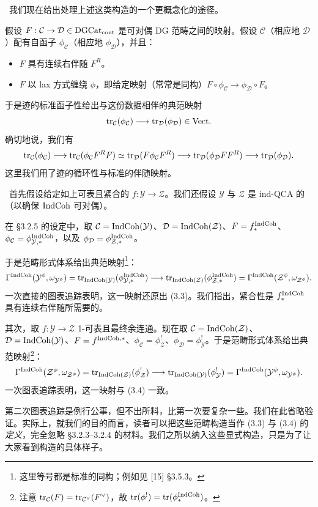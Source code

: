 \ 我们现在给出处理上述这类构造的一个更概念化的途径。

假设 $F : \mathcal{C} \to \mathcal{D} \in \mathrm{DGCat}_{\mathrm{cont}}$ 是可对偶 DG 范畴之间的映射。假设 $\mathcal{C}$（相应地 $\mathcal{D}$）配有自函子 $\phi_{\mathcal{C}}$（相应地 $\phi_{\mathcal{D}}$），并且：
\begin{itemize}
  \item $F$ 具有连续右伴随 $F^R$。
  \item $F$ 以 lax 方式缠绕 $\phi$，即给定映射（常常是同构）$F \circ \phi_{\mathcal{C}} \to \phi_{\mathcal{D}} \circ F$。
\end{itemize}
于是迹的标准函子性给出与这份数据相伴的典范映射
\[
  \operatorname{tr}_{\mathcal{C}}(\phi_{\mathcal{C}}) \longrightarrow \operatorname{tr}_{\mathcal{D}}(\phi_{\mathcal{D}}) \in \mathrm{Vect}.
\]
确切地说，我们有
\[
  \operatorname{tr}_{\mathcal{C}}(\phi_{\mathcal{C}}) \longrightarrow \operatorname{tr}_{\mathcal{C}}(\phi_{\mathcal{C}} F^R F)
  \simeq \operatorname{tr}_{\mathcal{D}}(F \phi_{\mathcal{C}} F^R) \longrightarrow \operatorname{tr}_{\mathcal{D}}(\phi_{\mathcal{D}} F F^R)
  \longrightarrow \operatorname{tr}_{\mathcal{D}}(\phi_{\mathcal{D}}).
\]
这里我们用了迹的循环性与标准的伴随映射。

\ 首先假设给定如上可表且紧合的 $f : \mathcal{Y} \to \mathcal{Z}$。我们还假设 $\mathcal{Y}$ 与 $\mathcal{Z}$ 是 ind-QCA 的（以确保 $\mathrm{IndCoh}$ 可对偶）。

在 §3.2.5 的设定中，取 $\mathcal{C} = \mathrm{IndCoh}(\mathcal{Y})$、$\mathcal{D} = \mathrm{IndCoh}(\mathcal{Z})$、$F = f^{\mathrm{IndCoh}}_*$、$\phi_{\mathcal{C}} = \phi^{\mathrm{IndCoh}}_{\mathcal{Y},*}$，以及 $\phi_{\mathcal{D}} = \phi^{\mathrm{IndCoh}}_{\mathcal{Z},*}$。

于是范畴形式体系给出典范映射\footnote{这里等号都是标准的同构；例如见 [15] §3.5.3。}：
\[
  \Gamma^{\mathrm{IndCoh}}(\mathcal{Y}^\phi, \omega_{\mathcal{Y}^\phi})
  = \operatorname{tr}_{\mathrm{IndCoh}(\mathcal{Y})}(\phi^{\mathrm{IndCoh}}_{\mathcal{Y},*})
  \longrightarrow \operatorname{tr}_{\mathrm{IndCoh}(\mathcal{Z})}(\phi^{\mathrm{IndCoh}}_{\mathcal{Z},*})
  = \Gamma^{\mathrm{IndCoh}}(\mathcal{Z}^\phi, \omega_{\mathcal{Z}^\phi}).
\]
一次直接的图表追踪表明，这一映射还原出 (3.3)。我们指出，紧合性是 $f^{\mathrm{IndCoh}}_*$ 具有连续右伴随所需要的。

其次，取 $f : \mathcal{Y} \to \mathcal{Z}$ 1-可表且最终余连通。现在取 $\mathcal{C} = \mathrm{IndCoh}(\mathcal{Z})$、$\mathcal{D} = \mathrm{IndCoh}(\mathcal{Y})$、$F = f^{\mathrm{IndCoh},*}$、$\phi_{\mathcal{C}} = \phi^!_{\mathcal{Z}}$、$\phi_{\mathcal{D}} = \phi^!_{\mathcal{Y}}$。于是范畴形式体系给出典范映射\footnote{注意 $\operatorname{tr}_{\mathcal{C}}(F) = \operatorname{tr}_{\mathcal{C}^\vee}(F^\vee)$，故 $\operatorname{tr}(\phi^!) = \operatorname{tr}(\phi^{\mathrm{IndCoh}}_*)$。}：
\[
  \Gamma^{\mathrm{IndCoh}}(\mathcal{Z}^\phi, \omega_{\mathcal{Z}^\phi})
  = \operatorname{tr}_{\mathrm{IndCoh}(\mathcal{Z})}(\phi^!_{\mathcal{Z}})
  \longrightarrow \operatorname{tr}_{\mathrm{IndCoh}(\mathcal{Y})}(\phi^!_{\mathcal{Y}})
  = \Gamma^{\mathrm{IndCoh}}(\mathcal{Y}^\phi, \omega_{\mathcal{Y}^\phi}).
\]
一次图表追踪表明，这一映射与 (3.4) 一致。

\begin{remark}
第二次图表追踪是例行公事，但不出所料，比第一次要复杂一些。我们在此省略验证。实际上，就我们的目的而言，读者可以把这些范畴构造当作 (3.3) 与 (3.4) 的\emph{定义}，完全忽略 §3.2.3--3.2.4 的材料。我们之所以纳入这些显式构造，只是为了让大家看到构造的具体样子。
\end{remark}
